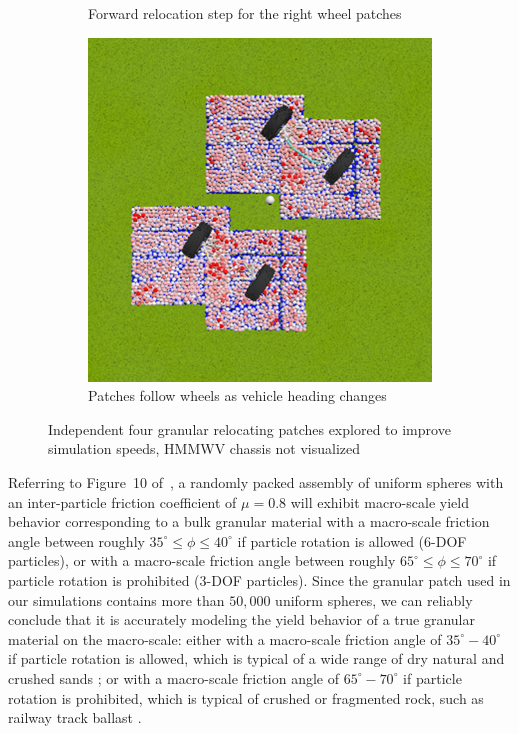 \documentclass[12pt,onecolumn]{report}
\begin{document}
\begin{figure}
\begin{subfigure}[b]{0.32\textwidth}
		\caption{\small Forward relocation step for the right wheel patches}   
		\label{fig:4PatchB}
	\end{subfigure}
	\hfill
	\begin{subfigure}[b]{0.32\textwidth}
		\centering
		\includegraphics[width=\linewidth]{Figs/4patch3.png}
		\caption{\small Patches follow wheels as vehicle heading changes}   
		\label{fig:4PatchC}
	\end{subfigure}
	\caption{\small Independent four granular relocating patches explored to improve simulation speeds, HMMWV chassis not visualized}
	\label{fig:4Patch}
\end{figure}

Referring to Figure~10 of~\cite{fleischmannetalGEGE2014}, a randomly packed assembly of uniform spheres with an inter-particle friction coefficient of $\mu = 0.8$ will exhibit macro-scale yield behavior corresponding to a bulk granular material with a macro-scale friction angle between roughly $35^\circ \leq \phi \leq 40^\circ$ if particle rotation is allowed (6-DOF particles), or with a macro-scale friction angle between roughly $65^\circ \leq \phi \leq 70^\circ$ if particle rotation is prohibited (3-DOF particles).
%
Since the granular patch used in our simulations contains more than $50,000$ uniform spheres, we can reliably conclude that it is accurately modeling the yield behavior of a true granular material on the macro-scale: either with a macro-scale friction angle of $35^\circ-40^\circ$ if particle rotation is allowed, which is typical of a wide range of dry natural and crushed sands \cite{Cho&Dodds&Santamarina2006}; or with a macro-scale friction angle of $65^\circ-70^\circ$ if particle rotation is prohibited, which is typical of crushed or fragmented rock, such as railway track ballast \cite{Indraratnaetal1998}.
\end{document}
